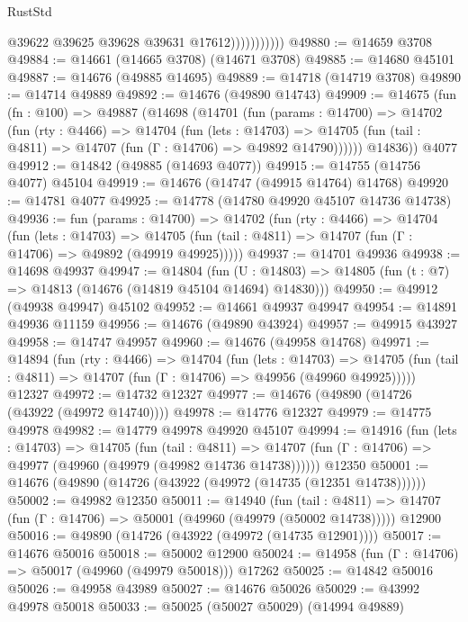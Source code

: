 \begin{lexlean}{RustStd}
\begin{coremodule}
                          @39622
                          @39625
                          @39628
                          @39631
                          @17612)))))))))))
@49880 := @14659 @3708
@49884 := @14661 (@14665 @3708) (@14671 @3708)
@49885 := @14680 @45101
@49887 := @14676 (@49885 @14695)
@49889 := @14718 (@14719 @3708)
@49890 := @14714 @49889
@49892 := @14676 (@49890 @14743)
@49909 := @14675
    (fun (fn : @100) =>
    @49887
      (@14698
        (@14701
          (fun (params : @14700) =>
          @14702
            (fun (rty : @4466) =>
            @14704
              (fun (lets : @14703) =>
              @14705 (fun (tail : @4811) => @14707 (fun (Γ : @14706) => @49892 @14790))))))
        @14836))
    @4077
@49912 := @14842 (@49885 (@14693 @4077))
@49915 := @14755 (@14756 @4077) @45104
@49919 := @14676 (@14747 (@49915 @14764) @14768)
@49920 := @14781 @4077
@49925 := @14778 (@14780 @49920 @45107 @14736 @14738)
@49936 := fun (params : @14700) =>
  @14702
    (fun (rty : @4466) =>
    @14704
      (fun (lets : @14703) =>
      @14705 (fun (tail : @4811) => @14707 (fun (Γ : @14706) => @49892 (@49919 @49925)))))
@49937 := @14701 @49936
@49938 := @14698 @49937
@49947 := @14804
    (fun (U : @14803) => @14805 (fun (t : @7) => @14813 (@14676 (@14819 @45104 @14694) @14830)))
@49950 := @49912 (@49938 @49947) @45102
@49952 := @14661 @49937 @49947
@49954 := @14891 @49936 @11159
@49956 := @14676 (@49890 @43924)
@49957 := @49915 @43927
@49958 := @14747 @49957
@49960 := @14676 (@49958 @14768)
@49971 := @14894
    (fun (rty : @4466) =>
    @14704
      (fun (lets : @14703) =>
      @14705 (fun (tail : @4811) => @14707 (fun (Γ : @14706) => @49956 (@49960 @49925)))))
    @12327
@49972 := @14732 @12327
@49977 := @14676 (@49890 (@14726 (@43922 (@49972 @14740))))
@49978 := @14776 @12327
@49979 := @14775 @49978
@49982 := @14779 @49978 @49920 @45107
@49994 := @14916
    (fun (lets : @14703) =>
    @14705
      (fun (tail : @4811) =>
      @14707 (fun (Γ : @14706) => @49977 (@49960 (@49979 (@49982 @14736 @14738))))))
    @12350
@50001 := @14676 (@49890 (@14726 (@43922 (@49972 (@14735 (@12351 @14738))))))
@50002 := @49982 @12350
@50011 := @14940
    (fun (tail : @4811) => @14707 (fun (Γ : @14706) => @50001 (@49960 (@49979 (@50002 @14738)))))
    @12900
@50016 := @49890 (@14726 (@43922 (@49972 (@14735 @12901))))
@50017 := @14676 @50016
@50018 := @50002 @12900
@50024 := @14958 (fun (Γ : @14706) => @50017 (@49960 (@49979 @50018))) @17262
@50025 := @14842 @50016
@50026 := @49958 @43989
@50027 := @14676 @50026
@50029 := @43992 @49978 @50018
@50033 := @50025 (@50027 @50029) (@14994 @49889)

\end{coremodule}
\end{lexlean}
